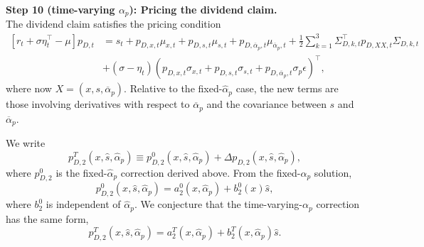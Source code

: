 \noindent\textbf{Step 10 (time-varying $\alpha_p$): Pricing the dividend claim.}\\
The dividend claim satisfies the pricing condition
\begin{align}\label{eq:pD-pricing-timevarying-alpha}
    \left[r_t+\sigma\eta_t^\top-\mu\right]p_{D,t}
    &= s_t + p_{D,x,t}\mu_{x,t}+p_{D,s,t}\mu_{s,t}
    +p_{D,\overline{\alpha}_p,t}\mu_{\overline{\alpha}_p,t}
    +\frac{1}{2}\sum_{k=1}^3 \Sigma_{D,k,t}^\top p_{D,XX,t}\Sigma_{D,k,t}
    \\
    &+(\sigma-\eta_t)\left(p_{D,x,t}\sigma_{x,t}+p_{D,s,t}\sigma_{s,t}
    +p_{D,\overline{\alpha}_p,t}\sigma_p\epsilon\right)^\top,
\end{align}
where now $X=(x,s,\overline{\alpha}_p)$.
Relative to the fixed-$\hat{\alpha}_p$ case, the new terms are those involving derivatives with respect to $\overline{\alpha}_p$ and the covariance between $s$ and $\overline{\alpha}_p$.

We write
\begin{equation}
    p_{D,2}^{T}(x,\hat{s},\hat{\alpha}_p)
    \equiv p_{D,2}^{0}(x,\hat{s},\hat{\alpha}_p)+\Delta p_{D,2}(x,\hat{s},\hat{\alpha}_p),
\end{equation}
where $p_{D,2}^{0}$ is the fixed-$\hat{\alpha}_p$ correction derived above.
From the fixed-$\hat{\alpha}_p$ solution,
\begin{equation}
    p_{D,2}^{0}(x,\hat{s},\hat{\alpha}_p)
    =a_2^{0}(x,\hat{\alpha}_p)+b_2^{0}(x)\hat{s},
\end{equation}
where $b_2^{0}$ is independent of $\hat{\alpha}_p$.
We conjecture that the time-varying-$\alpha_p$ correction has the same form,
\begin{equation}
    p_{D,2}^{T}(x,\hat{s},\hat{\alpha}_p)
    =a_2^{T}(x,\hat{\alpha}_p)+b_2^{T}(x,\hat{\alpha}_p)\hat{s}.
\end{equation}

